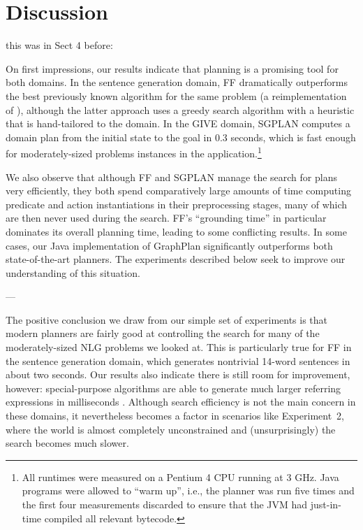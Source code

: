 \section{Discussion}
\label{sec:discussion}

this was in Sect 4 before:



On first impressions, our results indicate that planning is a promising
tool for both domains.  In the sentence generation domain, FF dramatically
outperforms the best previously known algorithm for the same problem (a
reimplementation of \citep{Stone2003a}), although the latter approach uses
a greedy search algorithm with a heuristic that is hand-tailored to the
domain. In the GIVE domain, SGPLAN computes a domain plan from the initial
state to the goal in 0.3 seconds, which is fast enough for moderately-sized
problems instances in the application.\footnote{All
  runtimes were measured on a Pentium 4 CPU running at 3 GHz. Java programs
  were allowed to ``warm up'', i.e., the planner was run five times and the
  first four measurements discarded to ensure that the JVM had just-in-time
  compiled all relevant bytecode.}

We also observe that although FF and SGPLAN manage the search for plans
very efficiently, they both spend comparatively large amounts of time
computing predicate and action instantiations in their preprocessing
stages, many of which are then never used during the search. FF's
``grounding time'' in particular dominates its overall planning time,
leading to some conflicting results. In some cases, our Java implementation
of GraphPlan significantly outperforms both state-of-the-art planners. The
experiments described below seek to improve our understanding of this
situation.


---



The positive conclusion we draw from our simple set of experiments is that
modern planners are fairly good at controlling the search for many of the
moderately-sized NLG problems we looked at. This is particularly true for
FF in the sentence generation domain, which generates nontrivial 14-word
sentences in about two seconds. Our results also indicate there is still
room for improvement, however: special-purpose algorithms are able to
generate much larger referring expressions in milliseconds
\citep{AreKolStr08}. Although search efficiency is not the main concern in
these domains, it nevertheless becomes a factor in scenarios like
Experiment~2, where the world is almost completely unconstrained and
(unsurprisingly) the search becomes much slower.

